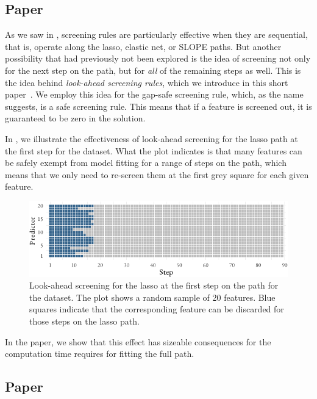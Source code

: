 \subsection{Paper \II}

As we saw in , screening rules are particularly effective when they are sequential, that is, operate along the lasso, elastic net, or SLOPE paths. But another possibility that had previously not been explored is the idea of screening not only for the next step on the path, but for \emph{all} of the remaining steps as well. This is the idea behind \emph{look-ahead screening rules}, which we introduce in this short paper~\parencite{larsson2021}. We employ this idea for the gap-safe screening rule, which, as the name suggests, is a safe screening rule. This means that if a feature is screened out, it is guaranteed to be zero in the solution.

In , we illustrate the effectiveness of look-ahead screening for the lasso path at the first step for the  dataset. What the plot indicates is that many features can be safely exempt from model fitting for a range of steps on the path, which means that we only need to re-screen them at the first grey square for each given feature.

\begin{figure}[htpb]
  \centering
  \includegraphics[]{figures/paper2-highlight.pdf}
  \caption{%
    Look-ahead screening for the lasso at the first step on the path for the  dataset. The plot shows a random sample of 20 features. Blue squares indicate that the corresponding feature can be discarded for those steps on the lasso path.
  }
  \label{fig:paper2-highlight}
\end{figure}

In the paper, we show that this effect has sizeable consequences for the computation time requires for fitting the full path.

\subsection{Paper \III}

